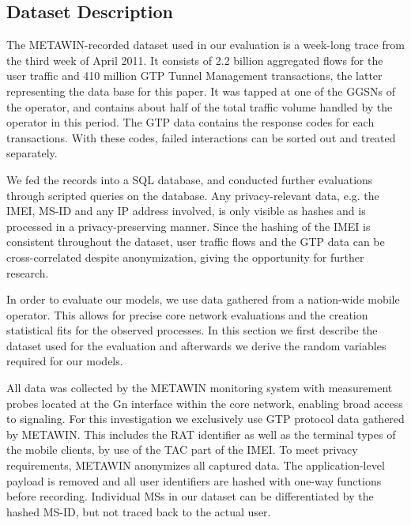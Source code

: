 \subsection{Dataset Description}


The \gls{METAWIN}-recorded dataset used in our evaluation is a week-long trace from the third week of April 2011. It consists of 2.2 billion aggregated flows for the user traffic and 410 million \gls{GTP} Tunnel Management transactions, the latter representing the data base for this paper. It was tapped at one of the \glspl{GGSN} of the operator, and contains about half of the total traffic volume handled by the operator in this period. The \gls{GTP} data contains the response codes for each transactions. With these codes, failed interactions can be sorted out and treated separately.

We fed the records into a SQL database, and conducted further evaluations through scripted queries on the database. Any privacy-relevant data, e.g. the \gls{IMEI}, \gls{MS-ID} and any IP address involved, is only visible as hashes and is processed in a privacy-preserving manner.  Since the hashing of the \gls{IMEI} is consistent throughout the dataset, user traffic flows and the \gls{GTP} data can be cross-correlated despite anonymization, giving the opportunity for further research.

In order to evaluate our models, we use data gathered from a nation-wide mobile operator. This allows for precise core network evaluations and the creation statistical fits for the observed processes.
In this section we first describe the dataset used for the evaluation and afterwards we derive the random variables required for our models.


All data was collected by the \gls{METAWIN} monitoring system \cite{ricciato_2011} with measurement probes located at the Gn interface within the core network, enabling broad access to signaling. For this investigation we exclusively use \gls{GTP} protocol data gathered by \gls{METAWIN}. This includes the \gls{RAT} identifier as well as the terminal types of the mobile clients, by use of the \gls{TAC} part of the \gls{IMEI}. %
To meet privacy requirements, \gls{METAWIN} anonymizes all captured data. The application-level payload is removed and all user identifiers are hashed with one-way functions before recording. Individual \glspl{MS} in our dataset can be differentiated by the hashed \gls{MS-ID}, but not traced back to the actual user.

